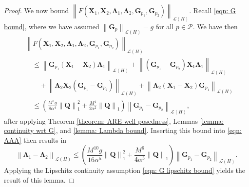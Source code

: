 \documentclass[10pt,a4paper]{amsart}
\newcommand{\bG}{\mathbf G}
\newcommand{\bLambda}{\boldsymbol{\Lambda}}
\newcommand{\bQ}{\mathbf Q}
\newcommand{\bX}{\mathbf X}
\newcommand{\norm}[1]{\left\| #1 \right\|}
\newcommand{\p}[1]{\left( {#1} \right)}
\newcommand{\sL}{\mathscr L}
\newcommand{\sP}{\mathcal{P}}
\begin{document}
\begin{proof}
    We now bound $\norm{F\p{\bX_1,\bX_2,\bLambda_1, \bLambda_2, \bG_{p_1}, \bG_{p_2}}}_{\sL\p{H}}$. Recall \eqref{eqn: G bound}, where we have assumed $\norm{\bG_{p}}_{\sL(H)} = g$ for all $p \in \sP$. We have then
    $$
    \begin{aligned}
        &\norm{F(\bX_1, \bX_2, \bLambda_1, \bLambda_2, \bG_{p_1}, \bG_{p_2})}_{\sL\p{H}} \\
        & \quad \leq \norm{\bG_{p_1}(\bX_1-\bX_2)\bLambda_1}_{\sL\p{H}}
        + \norm{(\bG_{p_1} - \bG_{p_2})\bX_1\bLambda_1 }_{\sL\p{H}} 
        \\&\qquad
        + \norm{\bLambda_2 \bX_2(\bG_{p_1}-\bG_{p_2})}_{\sL\p{H}} 
        + \norm{\bLambda_2(\bX_1 - \bX_2)\bG_{p_1}}_{\sL\p{H}} \\ 
        &\quad \leq \p{\frac{M^8g}{8\alpha^4} \norm{\bQ}^2_1 + \frac{M^4}{2\alpha^2}\norm{\bQ}_1} \norm{\bG_{p_1} - \bG_{p_2}}_{\sL(H)},
    \end{aligned}
    $$
    after applying Theorem \ref{theorem: ARE well-posedness}, Lemmas \ref{lemma: continuity wrt G}, and \ref{lemma: Lambda bound}. Inserting this bound into \eqref{eqn: AAA} then results in 
    $$
        \norm{\bLambda_1 - \bLambda_2}_{\sL\p{H}} 
        \leq \p{\frac{M^{10}g}{16\alpha^5}\norm{\bQ}^2_1 
        + \frac{M^6}{4\alpha^3}\norm{\bQ}_1 } \norm{\bG_{p_1} - \bG_{p_2}}_{\sL(H)}.
    $$
    Applying the Lipschitz continuity assumption \eqref{eqn: G lipschitz bound} yields the result of this lemma. 
\end{proof}
\end{document}
